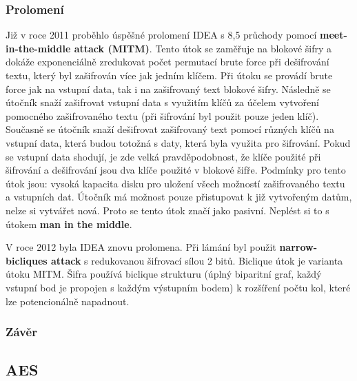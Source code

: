 \documentclass[12pt, a4paper]{article}
\begin{document}
		\subsubsection{Prolomení}
		Již v roce 2011 proběhlo úspěšné prolomení IDEA s 8,5 průchody pomocí \textbf{meet-in-the-middle attack (MITM)}. Tento útok se zaměřuje na blokové šifry a dokáže exponenciálně zredukovat počet permutací  brute force při dešifrování textu, který byl zašifrován více jak jedním klíčem. Při útoku se provádí brute force jak na vstupní data, tak i na zašifrovaný text blokové šifry. Následně se útočník snaží zašifrovat vstupní data s využitím klíčů za účelem vytvoření pomocného zašifrovaného textu (při šifrování byl použit pouze jeden klíč). Současně se útočník snaží dešifrovat zašifrovaný text pomocí různých klíčů na vstupní data, která budou totožná s daty, která byla využita pro šifrování. Pokud se vstupní data shodují, je zde velká pravděpodobnost, že klíče použité při šifrování a dešifrování jsou dva klíče použité v blokové šifře. Podmínky pro tento útok jsou: vysoká kapacita disku pro uložení všech možností zašifrovaného textu a vstupních dat. Útočník má možnost pouze přistupovat k již vytvořeným datům, nelze si vytvářet nová. Proto se tento útok značí jako pasivní. Neplést si to s útokem \textbf{man in the middle}.
		\par
		V roce 2012 byla IDEA znovu prolomena. Při lámání byl použit \textbf{narrow-bicliques attack} s redukovanou šifrovací sílou 2 bitů. Biclique útok je varianta útoku MITM. Šifra používá biclique strukturu (úplný biparitní graf, každý vstupní bod je propojen s každým výstupním bodem) k rozšíření počtu kol, které lze potencionálně napadnout.
		\subsubsection{Závěr}
	\subsection{AES}
	\label{subsec:aes}
\end{document}
